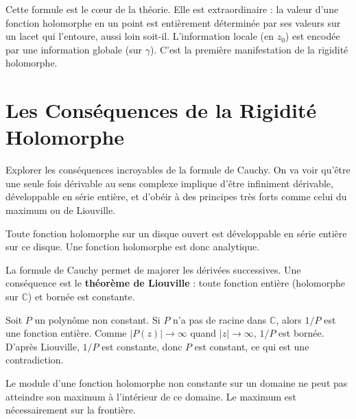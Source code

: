 \begin{remark}
    Cette formule est le cœur de la théorie. Elle est extraordinaire : la valeur d'une fonction holomorphe en un point est entièrement déterminée par ses valeurs sur un lacet qui l'entoure, aussi loin soit-il. L'information locale (en $z_0$) est encodée par une information globale (sur $\gamma$). C'est la première manifestation de la rigidité holomorphe.
\end{remark}

\section{Les Conséquences de la Rigidité Holomorphe}

\begin{objectif}
    Explorer les conséquences incroyables de la formule de Cauchy. On va voir qu'être une seule fois dérivable au sens complexe implique d'être infiniment dérivable, développable en série entière, et d'obéir à des principes très forts comme celui du maximum ou de Liouville.
\end{objectif}

\begin{corollary}
    Toute fonction holomorphe sur un disque ouvert est développable en série entière sur ce disque. Une fonction holomorphe est donc analytique.
\end{corollary}

\begin{theorem}
    La formule de Cauchy permet de majorer les dérivées successives. Une conséquence est le \textbf{théorème de Liouville} : toute fonction entière (holomorphe sur $\mathbb{C}$) et bornée est constante.
\end{theorem}

\begin{application}
    Soit $P$ un polynôme non constant. Si $P$ n'a pas de racine dans $\mathbb{C}$, alors $1/P$ est une fonction entière. Comme $|P(z)| \to \infty$ quand $|z| \to \infty$, $1/P$ est bornée. D'après Liouville, $1/P$ est constante, donc $P$ est constant, ce qui est une contradiction.
\end{application}

\begin{theorem}
    Le module d'une fonction holomorphe non constante sur un domaine ne peut pas atteindre son maximum à l'intérieur de ce domaine. Le maximum est nécessairement sur la frontière.
\end{theorem}


